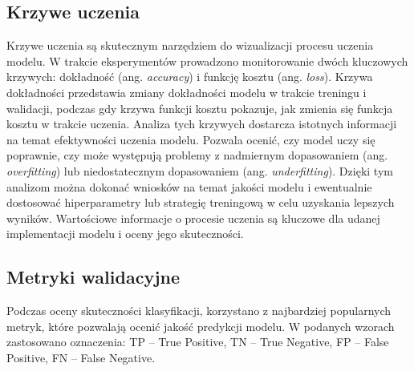 \subsection{Krzywe uczenia}
\label{subsec:krzywe-uczenia}

Krzywe uczenia są skutecznym narzędziem do wizualizacji procesu uczenia modelu.
W trakcie eksperymentów prowadzono monitorowanie dwóch kluczowych krzywych: dokładność (ang. \emph{accuracy}) i funkcję kosztu (ang. \emph{loss}).
Krzywa dokładności przedstawia zmiany dokładności modelu w trakcie treningu i walidacji, podczas gdy krzywa funkcji kosztu pokazuje, jak zmienia się funkcja kosztu w trakcie uczenia.
Analiza tych krzywych dostarcza istotnych informacji na temat efektywności uczenia modelu.
Pozwala ocenić, czy model uczy się poprawnie, czy może występują problemy z nadmiernym dopasowaniem  (ang. \emph{overfitting}) lub niedostatecznym dopasowaniem (ang. \emph{underfitting}).
Dzięki tym analizom można dokonać wniosków na temat jakości modelu i ewentualnie dostosować hiperparametry lub strategię treningową w celu uzyskania lepszych wyników.
Wartościowe informacje o procesie uczenia są kluczowe dla udanej implementacji modelu i oceny jego skuteczności.

\subsection{Metryki walidacyjne}
\label{subsec:metryki-waldiacyjne}

Podczas oceny skuteczności klasyfikacji, korzystano z najbardziej popularnych metryk, które pozwalają ocenić jakość predykcji modelu.
W podanych wzorach zastosowano oznaczenia:  TP – True Positive, TN – True Negative, FP – False Positive, FN – False Negative.

